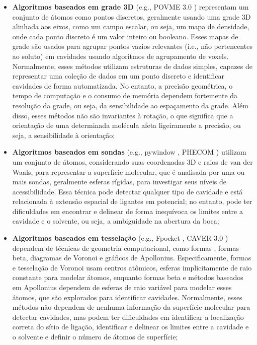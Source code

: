 \documentclass[Portugues]{phdquali}
\def\ie{i.e.\onedot}
\def\eg{e.g.\onedot}
\begin{document}
\begin{itemize}
  \item \textbf{Algoritmos baseados em grade 3D} (\eg, POVME 3.0 \cite{povme}) representam um conjunto de átomos como pontos discretos, geralmente usando uma grade 3D alinhada aos eixos, como um campo escalar, ou seja, um mapa de densidade, onde cada ponto discreto é um valor inteiro ou booleano. Esses mapas de grade são usados para agrupar pontos vazios relevantes (\ie, não pertencentes ao soluto) em cavidades usando algoritmos de agrupamento de voxels. Normalmente, esses métodos utilizam estruturas de dados simples, capazes de representar uma coleção de dados em um ponto discreto e identificar cavidades de forma automatizada. No entanto, a precisão geométrica, o tempo de computação e o consumo de memória dependem fortemente da resolução da grade, ou seja, da sensibilidade ao espaçamento da grade. Além disso, esses métodos não são invariantes à rotação, o que significa que a orientação de uma determinada molécula afeta ligeiramente a precisão, ou seja, a sensibilidade à orientação;

  \item \textbf{Algoritmos baseados em sondas} (\eg, pywindow \cite{pywindow}, PHECOM \cite{phecom}) utilizam um conjunto de átomos, considerando suas coordenadas 3D e raios de van der Waals, para representar a superfície molecular, que é analisada por uma ou mais sondas, geralmente esferas rígidas, para investigar seus níveis de acessibilidade. Essa técnica pode detectar qualquer tipo de cavidade e está relacionada à extensão espacial de ligantes em potencial; no entanto, pode ter dificuldades em encontrar e delinear de forma inequívoca os limites entre a cavidade e o solvente, ou seja, a ambiguidade na abertura da boca;
  
  \item \textbf{Algoritmos baseados em tesselação} (\eg, Fpocket \cite{fpocket}, CAVER 3.0 \cite{caver3}) dependem de técnicas de geometria computacional, como formas \textalpha, formas beta, diagramas de Voronoi e gráficos de Apollonius. Especificamente, formas \textalpha e tesselação de Voronoi usam centros atômicos, esferas implicitamente de raio constante para modelar átomos, enquanto formas beta e métodos baseados em Apollonius dependem de esferas de raio variável para modelar esses átomos, que são explorados para identificar cavidades. Normalmente, esses métodos não dependem de nenhuma informação da superfície molecular para detectar cavidades, mas podem ter dificuldades em identificar a localização correta do sítio de ligação, identificar e delinear os limites entre a cavidade e o solvente e definir o número de átomos de superfície;


\end{itemize}
\end{document}
